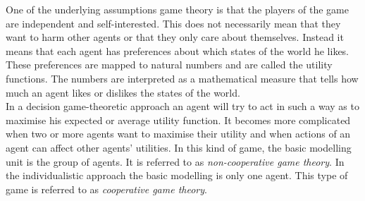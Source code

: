 One of the underlying assumptions game theory is that the players of the game are independent and self-interested. This does not necessarily mean that they want to harm other agents or that they only care about themselves. 
Instead it means that each agent has preferences about which states of the world he likes. These preferences are mapped to natural numbers and are called the utility functions. The numbers are interpreted as a mathematical measure that tells how much an agent likes or dislikes the states of the world. \\
In a decision game-theoretic approach an agent will try to act in such a way as to maximise his expected or average utility function. It becomes more complicated when two or more agents want to maximise their utility and when actions of an agent can affect other agents' utilities. In this kind of game, the basic modelling unit is the group of agents. It is referred to as \textit{non-cooperative game theory}. In the individualistic approach the basic modelling is only one agent. This type of game is referred to as \textit{cooperative game theory}. 

 


